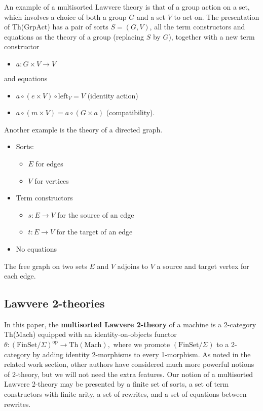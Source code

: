 \documentclass{article}
\newcommand{\maps}{\colon}
\newcommand{\FinSet}{\mathrm{FinSet}}
\newcommand{\op}{\mathrm{op}}
\begin{document}
An example of a multisorted Lawvere theory is that of a group action on a set, which involves a choice of both a group $G$ and a set $V$ to act on.  The presentation of Th(GrpAct) has a pair of sorts $S = (G, V)$, all the term constructors and equations as the theory of a group (replacing $S$ by $G$), together with a new term constructor
\begin{itemize}
  \item $a\maps G \times V \to V$
\end{itemize}
and equations
\begin{itemize}
  \item $a \circ (e \times V) \circ \mathrm{left}_V = V$ (identity action)
  \item $a \circ (m \times V) = a \circ (G \times a)$ (compatibility).
\end{itemize}

Another example is the theory of a directed graph.
\begin{itemize}
  \item Sorts:
  \begin{itemize}
    \item $E$ for edges
    \item $V$ for vertices
  \end{itemize}
  \item Term constructors
  \begin{itemize}
    \item $s\maps E \to V$ for the source of an edge
    \item $t\maps E \to V$ for the target of an edge
  \end{itemize}
  \item No equations
\end{itemize}
The free graph on two sets $E$ and $V$ adjoins to $V$ a source and target vertex for each edge.

\subsection {Lawvere 2-theories}
In this paper, the {\bf multisorted Lawvere 2-theory} of a machine is a 2-category Th(Mach) equipped with an identity-on-objects functor $\theta\maps (\FinSet/\Sigma)^\op \to \mathrm{Th(Mach)},$ where we promote $(\FinSet/\Sigma)$ to a 2-category by adding identity 2-morphisms to every 1-morphism.  As noted in the related work section, other authors have considered much more powerful notions of 2-theory, but we will not need the extra features.  Our notion of a multisorted Lawvere 2-theory may be presented by a finite set of sorts, a set of term constructors with finite arity, a set of rewrites, and a set of equations between rewrites.  
\end{document}

